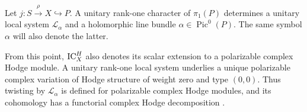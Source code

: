 Let $j:S\xrightarrow{\rho}X\hookrightarrow P$.  A unitary rank-one character
of $\pi_1(P)$ determines a unitary local system $\mathcal L_\alpha$ and a
holomorphic line bundle $\alpha\in\operatorname{Pic}^0(P)$.  The same symbol $\alpha$ will also denote the latter.

From this point, $\operatorname{IC}_X^H$ also denotes its scalar extension to a polarizable
complex Hodge module.  A unitary rank-one local system underlies a unique
polarizable complex variation of Hodge structure of weight zero and type
$(0,0)$.  Thus twisting by $\mathcal L_\alpha$ is defined for polarizable
complex Hodge modules, and its cohomology has a functorial complex Hodge
decomposition \cite[Sections~2.1 and~2.5]{KLM2026}.

